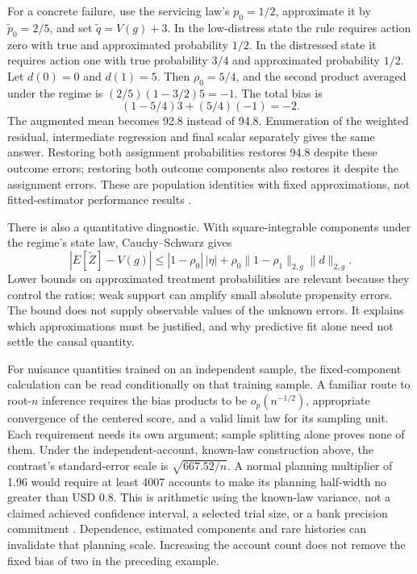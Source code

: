 For a concrete failure, use the servicing law's $p_0=1/2$, approximate it by
$\widetilde p_0=2/5$, and set $\widetilde q=V(g)+3$. In the low-distress
state the rule requires action zero with true and approximated probability
$1/2$. In the distressed state it requires action one with true probability
$3/4$ and approximated probability $1/2$. Let $d(0)=0$ and $d(1)=5$.
Then $\rho_0=5/4$, and the second product averaged under the regime is
$(2/5)(1-3/2)5=-1$. The total bias is
\[
 (1-5/4)3+(5/4)(-1)=-2.
\]
The augmented mean becomes 92.8 instead of 94.8. Enumeration of the weighted
residual, intermediate regression and final scalar separately gives the same
answer. Restoring both assignment probabilities restores 94.8 despite these
outcome errors; restoring both outcome components also restores it despite
the assignment errors. These are population identities with fixed
approximations, not fitted-estimator performance results
\cite{exec14_workflow_remainder}.

There is also a quantitative diagnostic. With square-integrable components
under the regime's state law, Cauchy--Schwarz gives
\[
 |E[\widetilde Z]-V(g)|
 \leq |1-\rho_0|\,|\eta|
 +\rho_0\|1-\rho_1\|_{2,g}\|d\|_{2,g}.
\]
Lower bounds on approximated treatment probabilities are relevant because
they control the ratios; weak support can amplify small absolute propensity
errors. The bound does not supply observable values of the unknown errors.
It explains which approximations must be justified, and why predictive fit
alone need not settle the causal quantity.

For nuisance quantities trained on an independent sample, the fixed-component
calculation can be read conditionally on that training sample. A familiar
route to root-$n$ inference requires the bias products to be
$o_p(n^{-1/2})$, appropriate convergence of the centered score, and a valid
limit law for its sampling unit. Each requirement needs its own argument;
sample splitting alone proves none of them. Under the independent-account,
known-law construction above, the contrast's standard-error scale is
$\sqrt{667.52/n}$. A normal planning multiplier of 1.96 would require at
least 4007 accounts to make its planning half-width no greater than USD 0.8.
This is arithmetic using the known-law variance, not a claimed achieved
confidence interval, a selected trial size, or a bank precision commitment
\cite{exec14_workflow_remainder}. Dependence, estimated components and rare
histories can invalidate that planning scale. Increasing the account count
does not remove the fixed bias of two in the preceding example.

